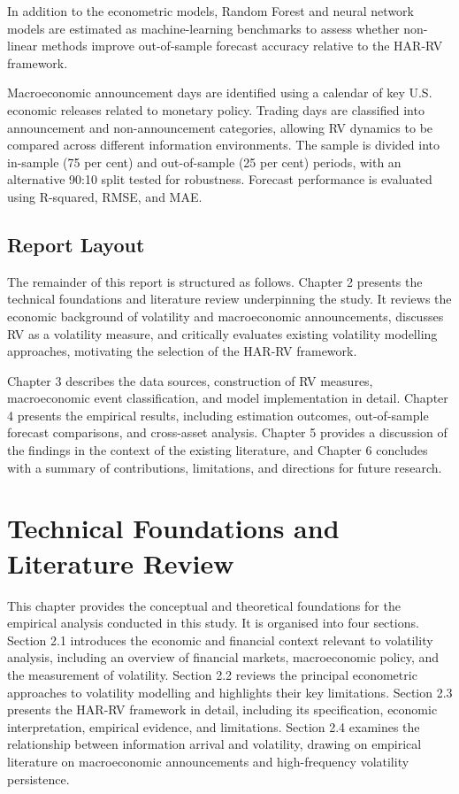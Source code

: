 \documentclass[12pt,a4paper]{report}
\begin{document}
In addition to the econometric models, Random Forest and neural network models are estimated as machine-learning benchmarks to assess whether non-linear methods improve out-of-sample forecast accuracy relative to the HAR-RV framework.

Macroeconomic announcement days are identified using a calendar of key U.S. economic releases related to monetary policy. Trading days are classified into announcement and non-announcement categories, allowing RV dynamics to be compared across different information environments. The sample is divided into in-sample (75 per cent) and out-of-sample (25 per cent) periods, with an alternative 90:10 split tested for robustness. Forecast performance is evaluated using R-squared, RMSE, and MAE.

\section{Report Layout}
The remainder of this report is structured as follows. Chapter 2 presents the technical foundations and literature review underpinning the study. It reviews the economic background of volatility and macroeconomic announcements, discusses RV as a volatility measure, and critically evaluates existing volatility modelling approaches, motivating the selection of the HAR-RV framework.

Chapter 3 describes the data sources, construction of RV measures, macroeconomic event classification, and model implementation in detail. Chapter 4 presents the empirical results, including estimation outcomes, out-of-sample forecast comparisons, and cross-asset analysis. Chapter 5 provides a discussion of the findings in the context of the existing literature, and Chapter 6 concludes with a summary of contributions, limitations, and directions for future research.

\chapter{Technical Foundations and Literature Review}
This chapter provides the conceptual and theoretical foundations for the empirical analysis conducted in this study. It is organised into four sections. Section 2.1 introduces the economic and financial context relevant to volatility analysis, including an overview of financial markets, macroeconomic policy, and the measurement of volatility. Section 2.2 reviews the principal econometric approaches to volatility modelling and highlights their key limitations. Section 2.3 presents the HAR-RV framework in detail, including its specification, economic interpretation, empirical evidence, and limitations. Section 2.4 examines the relationship between information arrival and volatility, drawing on empirical literature on macroeconomic announcements and high-frequency volatility persistence.
\end{document}

